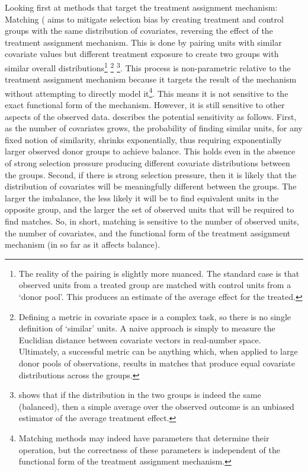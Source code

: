 \documentclass[../main.tex]{subfiles}
\begin{document}
\vspace{\baselineskip}
Looking first at methods that target the treatment assignment mechanism: Matching (\parencite{Rosenbaum1983TheEffects, Abadie2006LargeEffects} aims to mitigate selection bias by creating treatment and control groups with the same distribution of covariates, reversing the effect of the treatment assignment mechanism. This is done by pairing units with similar covariate values but different treatment exposure to create two groups with similar overall distributions\footnote{ The reality of the pairing is slightly more nuanced. The standard case is that observed units from a treated group are matched with control units from a ‘donor pool’. This produces an estimate of the average effect for the treated. } \footnote{ Defining a metric in covariate space is a complex task, so there is no single definition of ‘similar’ units. A naive approach is simply to measure the Euclidian distance between covariate vectors in real-number space. Ultimately, a successful metric can be anything which, when applied to large donor pools of observations, results in matches that produce equal covariate distributions across the groups. } \footnote{\textcite{Imai2008MisunderstandingsInference} shows that if the distribution in the two groups is indeed the same (balanced), then a simple average over the observed outcome is an unbiased estimator of the average treatment effect. }. This process is non-parametric relative to the treatment assignment mechanism because it targets the result of the mechanism without attempting to directly model it\footnote{ Matching methods may indeed have parameters that determine their operation, but the correctness of these parameters is independent of the functional form of the treatment assignment mechanism.  }. This means it is not sensitive to the exact functional form of the mechanism. However, it is still sensitive to other aspects of the observed data. \textcite{Broomberg2017DeepInference} describes the potential sensitivity as follows. First, as the number of covariates grows, the probability of finding similar units, for any fixed notion of similarity, shrinks exponentially, thus requiring exponentially larger observed donor groups to achieve balance. This holds even in the absence of strong selection pressure producing different covariate distributions between the groups. Second, if there is strong selection pressure, then it is likely that the distribution of covariates will be meaningfully different between the groups. The larger the imbalance, the less likely it will be to find equivalent units in the opposite group, and the larger the set of observed units that will be required to find matches. So, in short, matching is sensitive to the number of observed units, the number of covariates, and the functional form of the treatment assignment mechanism (in so far as it affects balance).\par
\end{document}
